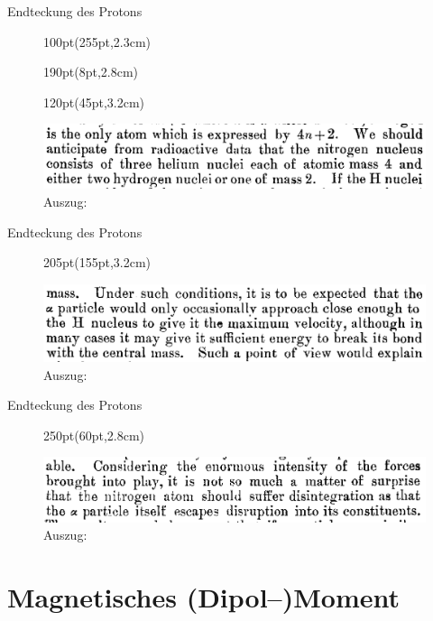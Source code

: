 \documentclass[t,9pt]{beamer}
\newcommand{\highlight}[3]{ \begin{textblock*}{#1}(#2,#3) \begin{tcolorbox} [enhanced,opacityfill=.1,colback=blue] \end{tcolorbox} \end{textblock*} } %
\begin{document}
        \begin{frame}{Endteckung des Protons}
                \begin{figure}
                        \highlight{100pt}{255pt}{2.3cm}
                        \highlight{190pt}{8pt}{2.8cm}
                        \highlight{120pt}{45pt}{3.2cm}
                        \includegraphics[width=\textwidth]{prosi_nitrogen_made_of_H.png}
                        \caption{Auszug:\cite{Rutherford1919}}
                \end{figure}
        \end{frame}

        \begin{frame}{Endteckung des Protons}
                \begin{figure}
                        \highlight{205pt}{155pt}{3.2cm}
                        \includegraphics[width=\textwidth]{prosi_alpha_breaks_H_from_nitrogen.png}
                        \caption{Auszug:\cite{Rutherford1919}}
                \end{figure}
        \end{frame}

        \begin{frame}{Endteckung des Protons}
                \begin{figure}
                        \highlight{250pt}{60pt}{2.8cm}
                        \includegraphics[width=\textwidth]{prosi_nitrogen_disintegrates.png}
                        \caption{Auszug:\cite{Rutherford1919}}
                \end{figure}
        \end{frame}

        \section{Magnetisches (Dipol--)Moment}
\end{document}
